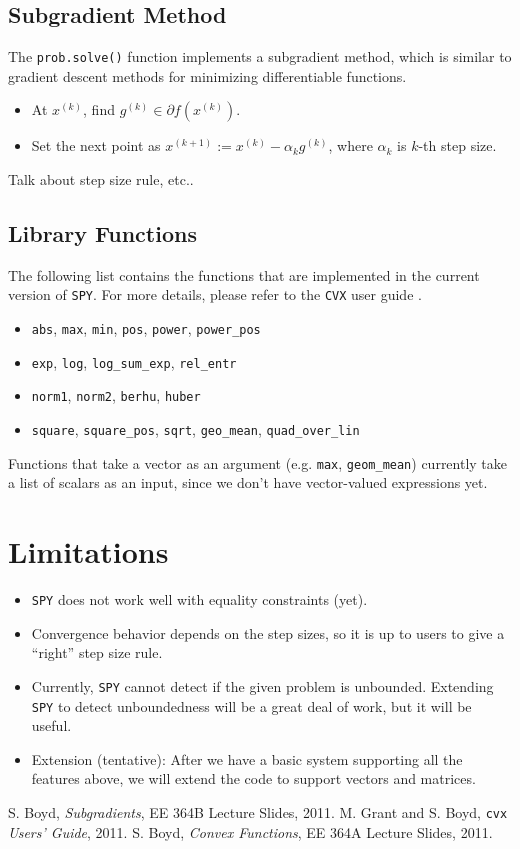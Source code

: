\documentclass[12pt]{article}
\begin{document}
\subsection{Subgradient Method}
The \verb'prob.solve()' function implements a subgradient method, which is similar to gradient descent methods for minimizing differentiable functions.

\begin{itemize}
\item At $x^{(k)}$, find $g^{(k)} \in \partial f(x^{(k)})$.
\item Set the next point as $x^{(k+1)}:=x^{(k)}-\alpha_kg^{(k)}$, where $\alpha_k$ is $k$-th step size.
\end{itemize}

Talk about step size rule, etc..

\subsection{Library Functions}
The following list contains the functions that are implemented in the current version of \verb'SPY'. For more details, please refer to the \verb'CVX' user guide \cite{guide}.
\begin{itemize}
\item \verb'abs', \verb'max', \verb'min', \verb'pos', \verb'power', \verb'power_pos'
\item \verb'exp', \verb'log', \verb'log_sum_exp', \verb'rel_entr'
\item \verb'norm1', \verb'norm2', \verb'berhu', \verb'huber'
\item \verb'square', \verb'square_pos', \verb'sqrt', \verb'geo_mean', \verb'quad_over_lin'
\end{itemize}
Functions that take a vector as an argument (e.g. \verb'max', \verb'geom_mean') currently take a list of scalars as an input, since we don't have vector-valued expressions yet.

\section{Limitations}

\begin{itemize}
\item \verb'SPY' does not work well with equality constraints (yet).
\item Convergence behavior depends on the step sizes, so it is up to users to give a ``right'' step size rule.
\item Currently, \verb'SPY' cannot detect if the given problem is unbounded. Extending \verb'SPY' to detect unboundedness will be a great deal of work, but it will be useful.
\item Extension (tentative): After we have a basic system supporting all the features above, we will extend the code to support vectors and matrices.
\end{itemize}




\begin{thebibliography}{99}
 S. Boyd, \emph{Subgradients}, EE 364B Lecture Slides, 2011.
 M. Grant and S. Boyd, \verb'cvx' \emph{Users' Guide}, 2011.
 S. Boyd, \emph{Convex Functions}, EE 364A Lecture Slides, 2011.
\end{thebibliography}
\end{document}
